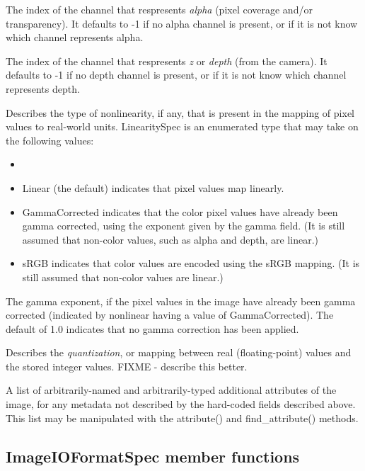 The index of the channel that respresents \emph{alpha} (pixel coverage
and/or transparency).  It defaults to -1 if no alpha channel is present,
or if it is not know which channel represents alpha.
\apiend

The index of the channel that respresents \emph{z} or \emph{depth} (from
the camera).  It defaults to -1 if no depth channel is present, or if it
is not know which channel represents depth.
\apiend

Describes the type of nonlinearity, if any, that is present in the
mapping of pixel values to real-world units.  {\kw LinearitySpec} is
an enumerated type that may take on the following values:
\begin{itemize}
\item[] 
\item {\kw Linear} (the default) indicates that pixel values map
  linearly.
\item {\kw GammaCorrected} indicates that the color pixel values have
  already been gamma corrected, using the exponent given by the {\kw
    gamma} field.  (It is still assumed that non-color values, such as
  alpha and depth, are linear.)
\item {\kw sRGB} indicates that color values are encoded using the sRGB
  mapping.  (It is still assumed that non-color values are linear.)
\end{itemize}
\apiend

The gamma exponent, if the pixel values in the image have already been
gamma corrected (indicated by {\kw nonlinear} having a value of {\kw
GammaCorrected}).  The default of 1.0 indicates that no gamma
correction has been applied.
\apiend

Describes the \emph{quantization}, or mapping between real
(floating-point) values and the stored integer values.
FIXME - describe this better.
\apiend

A list of arbitrarily-named and arbitrarily-typed additional attributes
of the image, for any metadata not described by the hard-coded fields
described above.  This list may be manipulated with the {\kw
attribute()} and {\kw find_attribute()} methods.
\apiend

\subsection{{\kw ImageIOFormatSpec} member functions}

